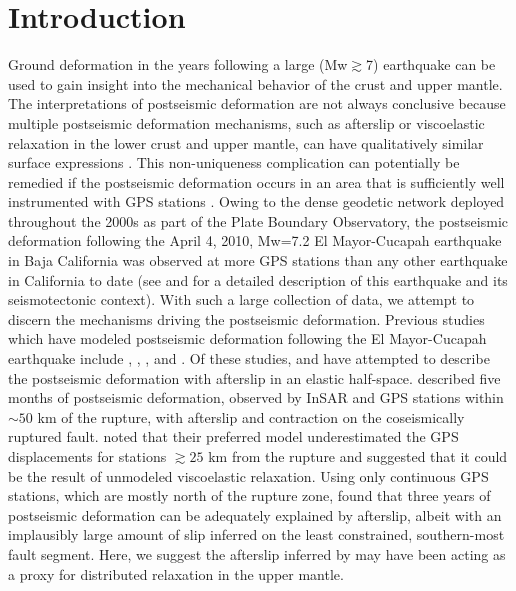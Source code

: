 \section{Introduction}
Ground deformation in the years following a large (Mw$\gtrsim$7) earthquake can be used to gain insight into the mechanical behavior of the crust and upper mantle. The interpretations of postseismic deformation are not always conclusive because multiple postseismic deformation mechanisms, such as afterslip or viscoelastic relaxation in the lower crust and upper mantle, can have qualitatively similar surface expressions \citep[e.g.][]{Savage1990}. This non-uniqueness complication can potentially be remedied if the postseismic deformation occurs in an area that is sufficiently well instrumented with GPS stations \citep{Hearn2003}.  Owing to the dense geodetic network deployed throughout the 2000s as part of the Plate Boundary Observatory, the postseismic deformation following the April 4, 2010, Mw=7.2 El Mayor-Cucapah earthquake in Baja California was observed at more GPS stations than any other earthquake in California to date (see \citet{Hauksson2011} and \citet{Fletcher2014} for a detailed description of this earthquake and its seismotectonic context).  With such a large collection of data, we attempt to discern the mechanisms driving the postseismic deformation. 
Previous studies which have modeled postseismic deformation following the El Mayor-Cucapah earthquake include \citet{Pollitz2012}, \citet{Gonzalez-ortega2014}, \citet{Spinler2015}, and \citet{Rollins2015}. Of these studies, \citet{Gonzalez-ortega2014} and \citet{Rollins2015} have attempted to describe the postseismic deformation with afterslip in an elastic half-space.  \citet{Gonzalez-ortega2014} described five months of postseismic deformation, observed by InSAR and GPS stations within ${\sim}50$ km of the rupture, with afterslip and contraction on the coseismically ruptured fault. \citet{Gonzalez-ortega2014} noted that their preferred model underestimated the GPS displacements for stations $\gtrsim 25$ km from the rupture and suggested that it could be the result of unmodeled viscoelastic relaxation.  Using only continuous GPS stations, which are mostly north of the rupture zone, \citet{Rollins2015} found that three years of postseismic deformation can be adequately explained by afterslip, albeit with an implausibly large amount of slip inferred on the least constrained, southern-most fault segment. Here, we suggest the afterslip inferred by \citet{Rollins2015} may have been acting as a proxy for distributed relaxation in the upper mantle. 

